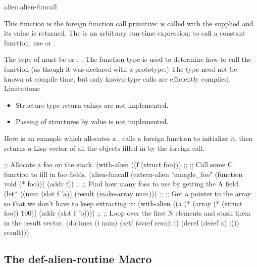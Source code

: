 \begin{defun}{alien:}{alien-funcall}{%
    }
  
  This function is the foreign function call primitive:
   is called with the supplied  and
  its value is returned.  The  is an arbitrary
  run-time expression; to call a constant function, use
   or .
  
  The type of  must be  or ,
  .  The function type is used to
  determine how to call the function (as though it was declared with
  a prototype.)  The type need not be known at compile time, but only
  known-type calls are efficiently compiled.  Limitations:
  \begin{itemize}
  \item Structure type return values are not implemented.
  \item Passing of structures by value is not implemented.
  \end{itemize}
\end{defun}

Here is an example which allocates a , calls a foreign
function to initialize it, then returns a Lisp vector of all the
 objects filled in by the foreign call:

\begin{lisp}
;; Allocate a foo on the stack.
(with-alien ((f (struct foo)))
  ;;
  ;; Call some C function to fill in foo fields.
  (alien-funcall (extern-alien "mangle_foo" (function void (* foo)))
                 (addr f))
  ;;
  ;; Find how many foos to use by getting the A field.
  (let* ((num (slot f 'a))
         (result (make-array num)))
    ;;
    ;; Get a pointer to the array so that we don't have to keep extracting it:
    (with-alien ((a (* (array (* (struct foo)) 100)) (addr (slot f 'b))))
      ;;
      ;; Loop over the first N elements and stash them in the result vector.
      (dotimes (i num)
        (setf (svref result i) (deref (deref a) i)))
      result)))
\end{lisp}


\subsection{The def-alien-routine Macro}

